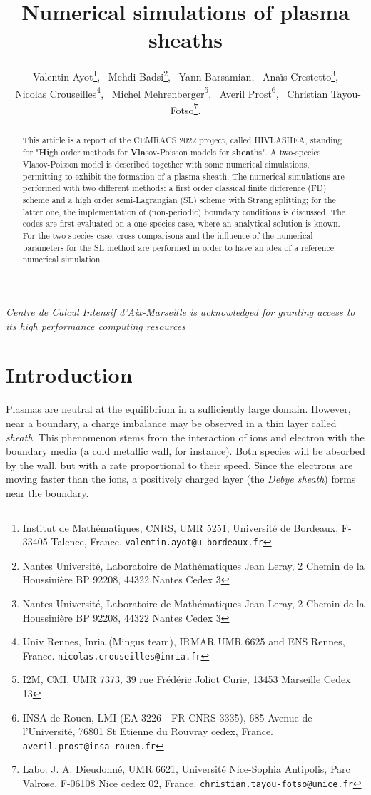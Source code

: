 \documentclass{article}
\title{Numerical simulations of plasma sheaths}
\author{
	Valentin Ayot\footnote{Institut de Math\'ematiques, CNRS, UMR 5251, Universit\'e de Bordeaux, F-33405 Talence, France. \texttt{valentin.ayot@u-bordeaux.fr}}, 
	\ Mehdi Badsi\footnote{Nantes Universit\'e, Laboratoire de Math\'ematiques Jean Leray, 2 Chemin de la Houssini\`ere BP 92208, 44322 Nantes Cedex 3},
	\ Yann Barsamian, 
	\ Ana\"is Crestetto\footnote{Nantes Universit\'e, Laboratoire de Math\'ematiques Jean Leray, 2 Chemin de la Houssini\`ere BP 92208, 44322 Nantes Cedex 3},\\
	\ Nicolas Crouseilles\footnote{Univ Rennes, Inria (Mingus team), IRMAR UMR 6625 and ENS Rennes, France. \texttt{nicolas.crouseilles@inria.fr}},
	\ Michel Mehrenberger\footnote{I2M, CMI, UMR 7373, 39 rue Fr\'ed\'eric Joliot Curie, 13453 Marseille Cedex 13},
	 \ Averil Prost\footnote{INSA de Rouen, LMI (EA 3226 - FR CNRS 3335), 685 Avenue de l'Universit\'e, 76801 St Etienne du Rouvray cedex, France. \texttt{averil.prost@insa-rouen.fr}}, 
	 \ Christian Tayou-Fotso\footnote{Labo. J. A. Dieudonn\'e, UMR 6621, Universit\'e Nice-Sophia Antipolis, Parc Valrose, F-06108 Nice cedex 02, France. \texttt{christian.tayou-fotso@unice.fr}}.
 }
\date{}
\numberwithin{equation}{section}
\begin{document}
	
\maketitle

\emph{Centre de Calcul Intensif d'Aix-Marseille is acknowledged for granting access to its high performance computing resources}

\begin{abstract}
	This article is a report of the   CEMRACS 2022 project, called HIVLASHEA, standing for "{\bf Hi}gh order methods for {\bf Vla}sov-Poisson models for {\bf shea}ths".
	A two-species Vlasov-Poisson model is described together with some numerical simulations, permitting to exhibit the formation of a plasma sheath. 
	The numerical simulations are performed with two different methods: a first order classical finite difference (FD) scheme and a high order semi-Lagrangian (SL) scheme with Strang splitting; for the latter one, the implementation
	of (non-periodic) boundary conditions is discussed. 
	The codes are first evaluated on a one-species case, where an analytical solution is known. For the two-species case, cross comparisons and the influence of the numerical parameters for the SL method are performed in order to have an idea of a reference numerical simulation.
\end{abstract}


\section{Introduction}
Plasmas are neutral at the equilibrium in a sufficiently large domain. However, near a boundary, a charge imbalance may be observed in a thin layer called \emph{sheath}.
This phenomenon stems from the interaction of ions and electron with the boundary media (a cold metallic wall, for instance). Both species will be absorbed by the wall, but with a rate proportional to their speed. Since the electrons are moving %
faster than the ions, a positively charged layer (the \emph{Debye sheath}) forms near the boundary. 
\end{document}
